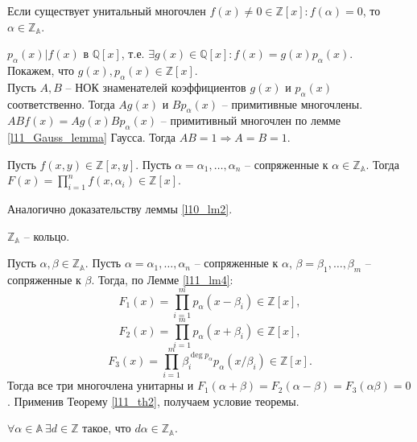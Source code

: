 \begin{theorem} \label{l11_th2}
	Если существует унитальный многочлен $f(x) \ne 0 \in \mathbb{Z}[x]: f(\alpha) = 0$, то $\alpha \in \mathbb{Z_{\mathbb{A}}}$.
\end{theorem}
\begin{pf}
	$p_{\alpha}(x) | f(x)$ в $\mathbb{Q}[x]$, т.е. $\exists g(x) \in \mathbb{Q}[x]: f(x) = g(x) p_{\alpha}(x)$.\\
	Покажем, что  $g(x), p_{\alpha}(x) \in \mathbb{Z}[x]$.\\
	Пусть $A, B$ -- НОК знаменателей коэффициентов $g(x)$ и $p_{\alpha}(x)$ соответственно. Тогда $Ag(x)$ и $Bp_{\alpha}(x)$ -- примитивные многочлены.\\
	$ABf(x) = Ag(x) Bp_{\alpha}(x)$ -- примитивный многочлен по лемме \ref{l11_Gauss_lemma} Гаусса. Тогда $AB = 1 \Rightarrow A = B = 1$.
\end{pf}

\begin{lemma} \label{l11_lm4}
	Пусть $f(x, y) \in \mathbb{Z}[x, y]$. Пусть $\alpha = \alpha_1, \ldots, \alpha_n$ -- сопряженные к $\alpha \in \mathbb{Z_{\mathbb{A}}}$.
	Тогда $\displaystyle F(x) = \prod_{i = 1}^{n} f(x, \alpha_i) \in \mathbb{Z}[x]$.
\end{lemma}
\begin{pf}
	Аналогично доказательству леммы \ref{l10_lm2}.
\end{pf}

\begin{theorem} \label{l11_th3}
	$\mathbb{Z_{\mathbb{A}}}$ -- кольцо.
\end{theorem}
\begin{pf}
	Пусть $\alpha, \beta \in \mathbb{Z_{\mathbb{A}}}$. Пусть $\alpha = \alpha_1, \ldots, \alpha_n$  -- сопряженные к $\alpha$, $\beta = \beta_1, \ldots, \beta_m$ -- сопряженные к $\beta$.
	Тогда, по Лемме \ref{l11_lm4}:
	$$F_1(x) = \prod_{i = 1}^{m} p_{\alpha}(x - \beta_i) \in \mathbb{Z}[x],$$
	$$F_2(x) = \prod_{i = 1}^{m} p_{\alpha}(x + \beta_i) \in \mathbb{Z}[x],$$
	$$F_3(x) = \prod_{i = 1}^{m} \beta_i^{\deg p_{\alpha}} p_{\alpha}(x / \beta_i) \in \mathbb{Z}[x].$$
	Тогда все три многочлена унитарны и $F_1(\alpha + \beta) = F_2(\alpha - \beta) = F_3(\alpha \beta) = 0$. Применив Теорему \ref{l11_th2}, получаем условие теоремы.
\end{pf}

\begin{problem}
	$\forall \alpha \in \mathbb{A} \ \exists d \in \mathbb{Z}$ такое, что $d \alpha \in \mathbb{Z_{\mathbb{A}}}$.
\end{problem}~\\

